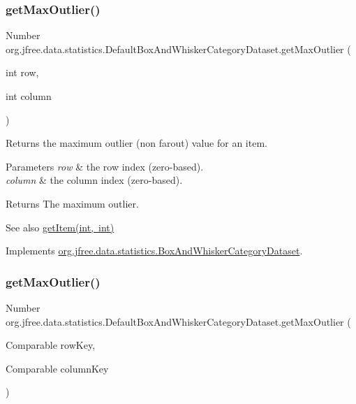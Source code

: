 \subsubsection{\texorpdfstring{get\+Max\+Outlier()}{getMaxOutlier()}\hspace{0.1cm}{\footnotesize\ttfamily [1/2]}}
{\footnotesize\ttfamily Number org.\+jfree.\+data.\+statistics.\+Default\+Box\+And\+Whisker\+Category\+Dataset.\+get\+Max\+Outlier (\begin{DoxyParamCaption}\item[{int}]{row,  }\item[{int}]{column }\end{DoxyParamCaption})}

Returns the maximum outlier (non farout) value for an item.


\begin{DoxyParams}{Parameters}
{\em row} & the row index (zero-\/based). \\
\hline
{\em column} & the column index (zero-\/based).\\
\hline
\end{DoxyParams}
\begin{DoxyReturn}{Returns}
The maximum outlier.
\end{DoxyReturn}
\begin{DoxySeeAlso}{See also}
\mbox{\hyperlink{classorg_1_1jfree_1_1data_1_1statistics_1_1_default_box_and_whisker_category_dataset_a85c944b06e4337059ea728b3a744e2a9}{get\+Item(int, int)}} 
\end{DoxySeeAlso}


Implements \mbox{\hyperlink{interfaceorg_1_1jfree_1_1data_1_1statistics_1_1_box_and_whisker_category_dataset_a768a51eab0c6f619fa19a05c4ef5b59a}{org.\+jfree.\+data.\+statistics.\+Box\+And\+Whisker\+Category\+Dataset}}.

\mbox{\label{classorg_1_1jfree_1_1data_1_1statistics_1_1_default_box_and_whisker_category_dataset_a566f976a566e583b34846b17d4fd79c2}} 
\subsubsection{\texorpdfstring{get\+Max\+Outlier()}{getMaxOutlier()}\hspace{0.1cm}{\footnotesize\ttfamily [2/2]}}
{\footnotesize\ttfamily Number org.\+jfree.\+data.\+statistics.\+Default\+Box\+And\+Whisker\+Category\+Dataset.\+get\+Max\+Outlier (\begin{DoxyParamCaption}\item[{Comparable}]{row\+Key,  }\item[{Comparable}]{column\+Key }\end{DoxyParamCaption})}

